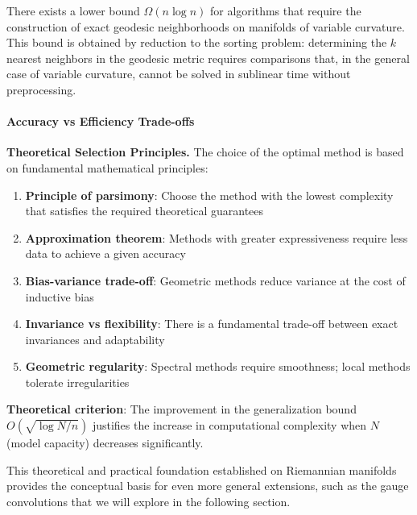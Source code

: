 \begin{remark}
There exists a lower bound $\Omega(n \log n)$ for algorithms that require the construction of exact geodesic neighborhoods on manifolds of variable curvature. This bound is obtained by reduction to the sorting problem: determining the $k$ nearest neighbors in the geodesic metric requires comparisons that, in the general case of variable curvature, cannot be solved in sublinear time without preprocessing.
\end{remark}

\paragraph{Accuracy vs Efficiency Trade-offs}

\textbf{Theoretical Selection Principles.} The choice of the optimal method is based on fundamental mathematical principles:

\begin{enumerate}
    \item \textbf{Principle of parsimony}: Choose the method with the lowest complexity that satisfies the required theoretical guarantees
    \item \textbf{Approximation theorem}: Methods with greater expressiveness require less data to achieve a given accuracy
    \item \textbf{Bias-variance trade-off}: Geometric methods reduce variance at the cost of inductive bias
    \item \textbf{Invariance vs flexibility}: There is a fundamental trade-off between exact invariances and adaptability
    \item \textbf{Geometric regularity}: Spectral methods require smoothness; local methods tolerate irregularities
\end{enumerate}

\textbf{Theoretical criterion}: The improvement in the generalization bound $O(\sqrt{\log N/n})$ justifies the increase in computational complexity when $N$ (model capacity) decreases significantly.

This theoretical and practical foundation established on Riemannian manifolds provides the conceptual basis for even more general extensions, such as the gauge convolutions that we will explore in the following section.
